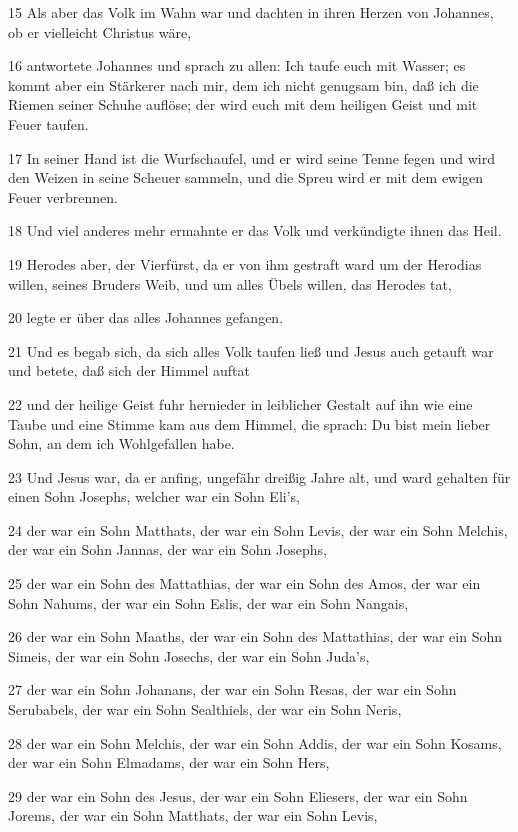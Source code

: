 \par 15 Als aber das Volk im Wahn war und dachten in ihren Herzen von Johannes, ob er vielleicht Christus wäre,
\par 16 antwortete Johannes und sprach zu allen: Ich taufe euch mit Wasser; es kommt aber ein Stärkerer nach mir, dem ich nicht genugsam bin, daß ich die Riemen seiner Schuhe auflöse; der wird euch mit dem heiligen Geist und mit Feuer taufen.
\par 17 In seiner Hand ist die Wurfschaufel, und er wird seine Tenne fegen und wird den Weizen in seine Scheuer sammeln, und die Spreu wird er mit dem ewigen Feuer verbrennen.
\par 18 Und viel anderes mehr ermahnte er das Volk und verkündigte ihnen das Heil.
\par 19 Herodes aber, der Vierfürst, da er von ihm gestraft ward um der Herodias willen, seines Bruders Weib, und um alles Übels willen, das Herodes tat,
\par 20 legte er über das alles Johannes gefangen.
\par 21 Und es begab sich, da sich alles Volk taufen ließ und Jesus auch getauft war und betete, daß sich der Himmel auftat
\par 22 und der heilige Geist fuhr hernieder in leiblicher Gestalt auf ihn wie eine Taube und eine Stimme kam aus dem Himmel, die sprach: Du bist mein lieber Sohn, an dem ich Wohlgefallen habe.
\par 23 Und Jesus war, da er anfing, ungefähr dreißig Jahre alt, und ward gehalten für einen Sohn Josephs, welcher war ein Sohn Eli's,
\par 24 der war ein Sohn Matthats, der war ein Sohn Levis, der war ein Sohn Melchis, der war ein Sohn Jannas, der war ein Sohn Josephs,
\par 25 der war ein Sohn des Mattathias, der war ein Sohn des Amos, der war ein Sohn Nahums, der war ein Sohn Eslis, der war ein Sohn Nangais,
\par 26 der war ein Sohn Maaths, der war ein Sohn des Mattathias, der war ein Sohn Simeis, der war ein Sohn Josechs, der war ein Sohn Juda's,
\par 27 der war ein Sohn Johanans, der war ein Sohn Resas, der war ein Sohn Serubabels, der war ein Sohn Sealthiels, der war ein Sohn Neris,
\par 28 der war ein Sohn Melchis, der war ein Sohn Addis, der war ein Sohn Kosams, der war ein Sohn Elmadams, der war ein Sohn Hers,
\par 29 der war ein Sohn des Jesus, der war ein Sohn Eliesers, der war ein Sohn Jorems, der war ein Sohn Matthats, der war ein Sohn Levis,
